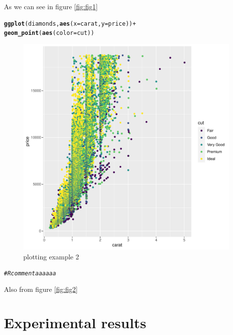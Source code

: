 \documentclass[12pt]{report}\usepackage[]{graphicx}\usepackage[]{xcolor}
\makeatletter
\newcommand{\hlcom}[1]{\textcolor[rgb]{0.678,0.584,0.686}{\textit{#1}}}%
\newcommand{\hlopt}[1]{\textcolor[rgb]{0,0,0}{#1}}%
\newcommand{\hlstd}[1]{\textcolor[rgb]{0.345,0.345,0.345}{#1}}%
\newcommand{\hlkwc}[1]{\textcolor[rgb]{0.333,0.667,0.333}{#1}}%
\newcommand{\hlkwd}[1]{\textcolor[rgb]{0.737,0.353,0.396}{\textbf{#1}}}%
\newenvironment{kframe}{%
 \def\at@end@of@kframe{}%
 \ifinner\ifhmode%
  \def\at@end@of@kframe{\end{minipage}}%
  \begin{minipage}{\columnwidth}%
 \fi\fi%
 \def\FrameCommand##1{\hskip\@totalleftmargin \hskip-\fboxsep
 \colorbox{shadecolor}{##1}\hskip-\fboxsep
     \hskip-\linewidth \hskip-\@totalleftmargin \hskip\columnwidth}%
 \MakeFramed {\advance\hsize-\width
   \@totalleftmargin\z@ \linewidth\hsize
   \@setminipage}}%
 {\par\unskip\endMakeFramed%
 \at@end@of@kframe}
\newenvironment{knitrout}{}{} %
\makeatother
\begin{document}
As we can see in figure \ref{fig:fig1}

    \pagebreak
    
\begin{knitrout}
\color{fgcolor}\begin{kframe}
\begin{alltt}
\hlkwd{ggplot}\hlstd{(diamonds,} \hlkwd{aes}\hlstd{(}\hlkwc{x} \hlstd{= carat,} \hlkwc{y} \hlstd{= price))} \hlopt{+}
\hlkwd{geom_point}\hlstd{(}\hlkwd{aes}\hlstd{(}\hlkwc{color} \hlstd{= cut))}
\end{alltt}
\end{kframe}\begin{figure}[H]

{\centering \includegraphics[width=0.75\linewidth]{figure/Carat_and_price-1} 

}

\caption{\label{fig:fig2}plotting example 2}\label{fig:Carat and price}
\end{figure}

\begin{kframe}\begin{alltt}
\hlcom{# R comment aaaaaa}
\end{alltt}
\end{kframe}
\end{knitrout}

Also from figure \ref{fig:fig2}

    \chapter*{Experimental results}\label{ch:sec2}
\end{document}
